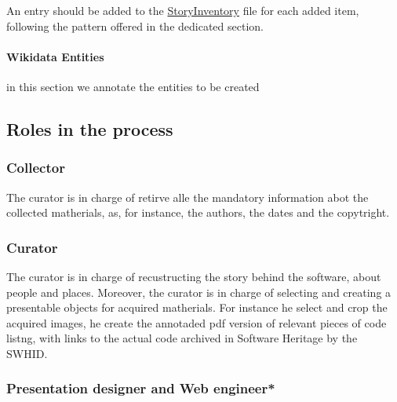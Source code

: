 \documentclass[]{article}
\begin{document}
An entry should be added to the
\href{https://github.com/Unipisa/Softi-Workbench/blob/structure_review/additional-materials/swh_stories_workplace/StoryInventory.md}{StoryInventory}
file for each added item, following the pattern offered in the dedicated
section.

\hypertarget{wikidata-entities}{%
\paragraph{Wikidata Entities}\label{wikidata-entities}}

in this section we annotate the entities to be created

\hypertarget{roles-in-the-process}{%
\subsection{Roles in the process}\label{roles-in-the-process}}

\hypertarget{collector}{%
\subsubsection{\texorpdfstring{\textbf{Collector}}{Collector}}\label{collector}}

The curator is in charge of retirve alle the mandatory information abot
the collected matherials, as, for instance, the authors, the dates and
the copytright.

\hypertarget{curator}{%
\subsubsection{\texorpdfstring{\textbf{Curator}}{Curator}}\label{curator}}

The curator is in charge of recustructing the story behind the software,
about people and places. Moreover, the curator is in charge of selecting
and creating a presentable objects for acquired matherials. For instance
he select and crop the acquired images, he create the annotaded pdf
version of relevant pieces of code listng, with links to the actual code
archived in Software Heritage by the SWHID.

\hypertarget{presentation-designer-and-web-engineer}{%
\subsubsection{\texorpdfstring{\textbf{Presentation designer and Web
engineer}*}{Presentation designer and Web engineer*}}\label{presentation-designer-and-web-engineer}}
\end{document}
